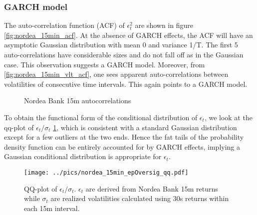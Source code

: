 \documentclass{book}
\begin{document}
\subsubsection{GARCH model}
The auto-correlation function (ACF) of $\epsilon_t^2$ are shown in figure
\ref{fig:nordea_15min_acf}. At the absence of GARCH effects, the ACF
will have an asymptotic Gaussian distribution with mean 0 and variance
1/T. The first 5 auto-correlations have considerable sizes and do not
fall off as in the Gaussian case. This observation suggests a GARCH
model. Moreover, from \ref{fig:nordea_15min_vlt_acf}, one sees
apparent auto-correlations between volatilities of consecutive time
intervals. This again points to a GARCH model.
\begin{figure}[htb!]
  \centering
  \caption{Nordea Bank 15m autocorrelations}
\end{figure}

To obtain the functional form of the conditional distribution of
$\epsilon_t$, we look at the qq-plot of $\epsilon_t/\sigma_t$
\ref{fig:nordea_15min_epOversig_qq}, which is consistent with a
standard Gaussian distribution except for a few outliers at the two
ends. Hence the fat tails of the probability density function can be
entirely accounted for by GARCH effects, implying a Gaussian
conditional distribution is appropriate for $\epsilon_t$. 
\begin{figure}[htb!]
  \centering
    \texttt{[image: ../pics/nordea\_15min\_epOversig\_qq.pdf]}
  \caption{QQ-plot of $\epsilon_t / \sigma_t$. $\epsilon_t$ are
    derived from Nordea Bank 15m returns while $\sigma_t$ are realized
    volatilities calculated using 30s returns within each 15m
    interval.}
  \label{fig:nordea_15min_epOversig_qq}
\end{figure}
\end{document}
